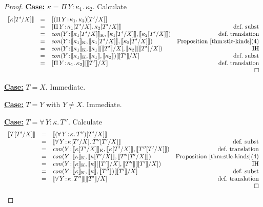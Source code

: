 \documentclass{article}
\newcommand{\abs}[4]{{#1}\, #2\! : \! #3.\, #4}
\newcommand{\interp}[1]{\llbracket #1 \rrbracket}
\newcommand{\startcase}[1]{\vspace{#1} \noindent\textbf{\underline{Case:}}}
\begin{document}
\begin{proof}
  \startcase{.2cm} \(\kappa = \abs{\Pi}{Y}{\kappa_1}{\kappa_2}\).
  Calculate
  \[
    \begin{array}{lclr}
      \interp{\kappa[T'/X]}
      & =
      & \interp{(\abs{\Pi}{Y}{\kappa_1}{\kappa_2})[T'/X]}
      &
      \\
      & =
      & \interp{\abs{\Pi}{Y}{\kappa_1[T'/X]}{\kappa_2[T'/X]}}
      & \text{def.\ subst}
      \\
      & =
      & \mathit{con}(Y\!:\!\interp{\kappa_1[T'/X]}_{\text{K}}, \interp{\kappa_1[T'/X]},
        \interp{\kappa_2[T'/X]})
      & \text{def.\ translation}
      \\
      & =
      & \mathit{con}(Y\!:\!\interp{\kappa_1}_{\text{K}}, \interp{\kappa_1[T'/X]},
        \interp{\kappa_2[T'/X]})
      & \text{Proposition~\ref{thm:stlc-kinds}(4)}        
      \\
      & =
      & \mathit{con}(Y\!:\!\interp{\kappa_1}_{\text{K}}, \interp{\kappa_1}[\interp{T'}/X],
        \interp{\kappa_2}[\interp{T'}/X])
      & \text{IH}
      \\
      & =
      &
        \mathit{con}(Y\!:\!\interp{\kappa_1}_{\text{K}},\interp{\kappa_1},\interp{\kappa_2})[\interp{T'}/X]
      & \text{def.\ subst}
      \\
      & =
      & \interp{\abs{\Pi}{Y}{\kappa_1}{\kappa_2}}[\interp{T'}/X]
      & \text{def.\ translation}
      \\
      &
      &
      & \qed
    \end{array}
  \]
  
  \startcase{.2cm} \(T = X\). Immediate.

  \startcase{.2cm} \(T = Y\) with \(Y \neq X\). Immediate.

  \startcase{.2cm} \(T = \abs{\forall}{Y}{\kappa}{T''}\).
  Calculate
  \[
    \begin{array}{lclr}
      \interp{T[T'/X]}
      & =
      & \interp{(\abs{\forall}{Y}{\kappa}{T''})[T'/X]}
      &
      \\
      & =
      & \interp{\abs{\forall}{Y}{\kappa[T'/X]}{T''[T'/X]}}
      & \text{def.\ subst}
      \\
      & =
      & \mathit{con}(Y\!:\!\interp{\kappa[T'/X]}_{\text{K}},\interp{\kappa[T'/X]},\interp{T''[T'/X]})
      & \text{def.\ translation}
      \\
      & =
      & \mathit{con}(Y\!:\!\interp{\kappa}_{\text{K}},\interp{\kappa[T'/X]},\interp{T''[T'/X]})
      & \text{Proposition~\ref{thm:stlc-kinds}(4)}
      \\
      & =
      & \mathit{con}(Y\!:\!\interp{\kappa}_{\text{K}},\interp{\kappa}[\interp{T'}/X],\interp{T''}[\interp{T'}/X])
      & \text{IH}
      \\
      & =
      &
        \mathit{con}(Y\!:\!\interp{\kappa}_{\text{K}},\interp{\kappa},\interp{T''})[\interp{T'}/X]
      & \text{def.\ subst}
      \\
      & =
      & \interp{\abs{\forall}{Y}{\kappa}{T''}}[\interp{T'}/X]
      & \text{def.\ translation}
      \\
      &
      &
      & \qed
    \end{array}
  \]


\end{proof}
\end{document}
